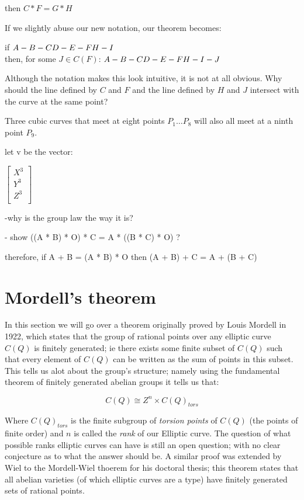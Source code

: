 \documentclass{article}
\begin{document}
then $C * F = G * H$

If we slightly abuse our new notation, our theorem becomes:

if
$
\\
A - B - C \\
D - E - F \\
H - I
$\\
then, for some $J \in C(F)$:
$
\\
A - B - C \\
D - E - F \\
H - I - J
$

Although the notation makes this look intuitive, it is not at all obvious. 
Why should the line defined by $C$ and $F$ and the line defined by $H$ and $J$ intersect with the curve at the same point? 

Three cubic curves that meet at eight points $P_1 \dots P_8$ will also all meet at a ninth point $P_9$.

let v be the vector:

$
\begin{bmatrix}
X^3 \\
Y^3 \\
Z^3 \\
\end{bmatrix} 
$

-why is the group law the way it is?

- show ((A * B) * O) * C = A * ((B * C) * O) ?

therefore, if A + B = (A * B) * O then (A + B) + C = A + (B + C)

\newpage

\section{Mordell's theorem}

In this section we will go over a theorem originally proved by Louis Mordell in 1922, which states that the group of rational points over any elliptic curve $C(Q)$ is finitely generated; ie there exists some finite subset of $C(Q)$ such that every element of $C(Q)$ can be written as the sum of points in this subset. This tells us alot about the group's structure; namely using the fundamental theorem of finitely generated abelian groups it tells us that:

\[C(Q) \cong Z^n \times C(Q)_{tors}\]

Where $C(Q)_{tors}$ is the finite subgroup of \emph{torsion points} of $C(Q)$ (the points of finite order) and $n$ is called the \emph{rank} of our Elliptic curve. The question of what possible ranks elliptic curves can have is still an open question; with no clear conjecture as to what the answer should be. A similar proof was extended by Wiel to the Mordell-Wiel thoerem for his doctoral thesis; this theorem states that all abelian varieties (of which elliptic curves are a type) have finitely generated sets of rational points.\\
\end{document}
